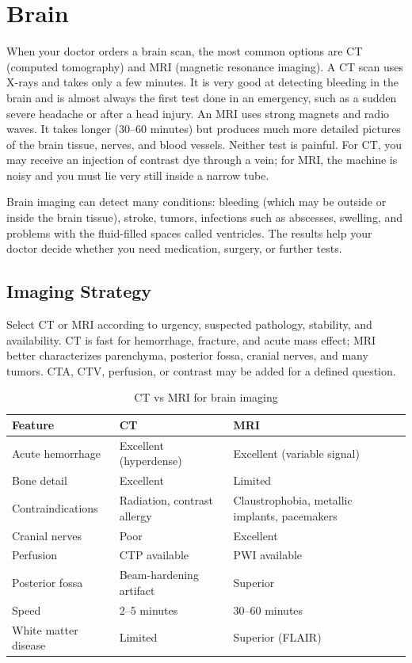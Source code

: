 \chapter{Brain}

\label{ch:ch38_brain}

When your doctor orders a brain scan, the most common options are CT (computed tomography) and MRI (magnetic resonance imaging). A CT scan uses X-rays and takes only a few minutes. It is very good at detecting bleeding in the brain and is almost always the first test done in an emergency, such as a sudden severe headache or after a head injury. An MRI uses strong magnets and radio waves. It takes longer (30--60 minutes) but produces much more detailed pictures of the brain tissue, nerves, and blood vessels. Neither test is painful. For CT, you may receive an injection of contrast dye through a vein; for MRI, the machine is noisy and you must lie very still inside a narrow tube.

Brain imaging can detect many conditions: bleeding (which may be outside or inside the brain tissue), stroke, tumors, infections such as abscesses, swelling, and problems with the fluid-filled spaces called ventricles. The results help your doctor decide whether you need medication, surgery, or further tests.


\section{Imaging Strategy}
Select CT or MRI according to urgency, suspected pathology, stability, and availability. CT is fast for hemorrhage, fracture, and acute mass effect; MRI better characterizes parenchyma, posterior fossa, cranial nerves, and many tumors. CTA, CTV, perfusion, or contrast may be added for a defined question.

\begin{table}[h]
\centering
\caption{CT vs MRI for brain imaging}
\begin{tabular}{p{3.5cm} p{5.5cm} p{5.5cm}}
\hline
\textbf{Feature} & \textbf{CT} & \textbf{MRI} \\
\hline
Acute hemorrhage & Excellent (hyperdense) & Excellent (variable signal) \\
Bone detail & Excellent & Limited \\
Contraindications & Radiation, contrast allergy & Claustrophobia, metallic implants, pacemakers \\
Cranial nerves & Poor & Excellent \\
Perfusion & CTP available & PWI available \\
Posterior fossa & Beam-hardening artifact & Superior \\
Speed & 2--5 minutes & 30--60 minutes \\
White matter disease & Limited & Superior (FLAIR) \\
\hline
\end{tabular}
\end{table}

